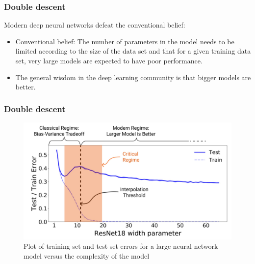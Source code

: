 \documentclass{beamer}
\begin{document}
\begin{frame}
    \frametitle{Double descent}
    Modern deep neural networks defeat the conventional belief:
    \begin{itemize}
        \item Conventional belief: The number of parameters in the model needs to be limited according to the size of the data set and that for a given training data set, very large models are expected to have poor performance.
        \item The general wisdom in the deep learning community is that bigger models are better.
    \end{itemize}
\end{frame}

\begin{frame}
    \frametitle{Double descent}
    \begin{figure}
        \caption{Plot of training set and test set errors for a large neural network model versus the complexity of the model}
        \includegraphics[height=0.6\textheight]{Figure_9.jpg}
    \end{figure}
\end{frame}
\end{document}
